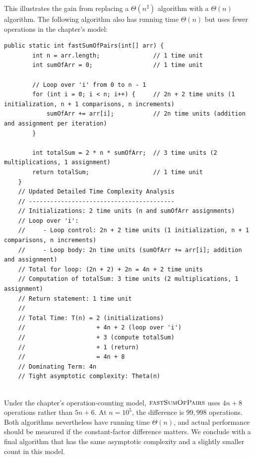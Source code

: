This illustrates the gain from replacing a $\Theta(n^2)$ algorithm with a $\Theta(n)$ algorithm. The following algorithm also has running time $\Theta(n)$ but uses fewer operations in the chapter's model:


\begin{lstlisting}[style = javaStyle, caption={Fast Sum of Pairs with Analysis}, label={lst:java_fast_sum_pairs_analysis}]
    public static int fastSumOfPairs(int[] arr) {
        int n = arr.length;               // 1 time unit
        int sumOfArr = 0;                 // 1 time unit
    
        // Loop over 'i' from 0 to n - 1
        for (int i = 0; i < n; i++) {     // 2n + 2 time units (1 initialization, n + 1 comparisons, n increments)
            sumOfArr += arr[i];           // 2n time units (addition and assignment per iteration)
        }
    
        int totalSum = 2 * n * sumOfArr;  // 3 time units (2 multiplications, 1 assignment)
        return totalSum;                  // 1 time unit
    }
    // Updated Detailed Time Complexity Analysis
    // -----------------------------------------
    // Initializations: 2 time units (n and sumOfArr assignments)
    // Loop over 'i':
    //     - Loop control: 2n + 2 time units (1 initialization, n + 1 comparisons, n increments)
    //     - Loop body: 2n time units (sumOfArr += arr[i]; addition and assignment)
    // Total for loop: (2n + 2) + 2n = 4n + 2 time units
    // Computation of totalSum: 3 time units (2 multiplications, 1 assignment)
    // Return statement: 1 time unit
    //
    // Total Time: T(n) = 2 (initializations)
    //                    + 4n + 2 (loop over 'i')
    //                    + 3 (compute totalSum)
    //                    + 1 (return)
    //                    = 4n + 8
    // Dominating Term: 4n
    // Tight asymptotic complexity: Theta(n)
    
\end{lstlisting}  

Under the chapter's operation-counting model, $\proc{fastSumOfPairs}$ uses $4n+8$ operations rather than $5n+6$. At $n=10^5$, the difference is $99,998$ operations. Both algorithms nevertheless have running time $\Theta(n)$, and actual performance should be measured if the constant-factor difference matters. We conclude with a final algorithm that has the same asymptotic complexity and a slightly smaller count in this model.

